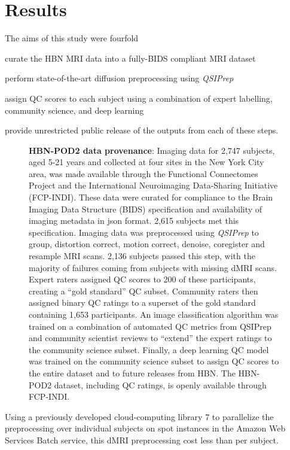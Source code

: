 \documentclass[fleqn,10pt]{wlscirep}
\begin{document}
\section*{Results}

The aims of this study were fourfold
\begin{enumerate*}[%
    label=(\roman*),%
    before=\unskip{: },%
    itemjoin={{, }},%
    itemjoin*={{, and }}]
    \item curate the HBN MRI data into a fully-BIDS compliant MRI dataset
    \item perform state-of-the-art diffusion preprocessing using \emph{QSIPrep}
    \item assign QC scores to each subject using a combination of expert labelling, community science, and deep learning
    \item provide unrestricted public release of the outputs from each of these steps.
\end{enumerate*}

\begin{figure}[ht]
    \centering
    \caption{%
        {\bf HBN-POD2 data provenance}:
        Imaging data for 2,747 subjects, aged 5-21 years and collected at four
        sites in the New York City area, was made available through the
        Functional Connectomes Project and the International Neuroimaging
        Data-Sharing Initiative (FCP-INDI).
        These data were curated for compliance to the Brain Imaging Data
        Structure (BIDS) specification \cite{gorgolewski2016-lh} and
        availability of imaging metadata in json format. 2,615 subjects met this
        specification.
        Imaging data was preprocessed using \emph{QSIPrep} \cite{cieslak2021-iq}
        to group, distortion correct, motion correct, denoise, coregister and
        resample MRI scans. 2,136 subjects passed this step, with the majority
        of failures coming from subjects with missing dMRI scans.
        Expert raters assigned QC scores to 200 of these participants, creating
        a ``gold standard'' QC subset. Community raters then assigned binary QC
        ratings to a superset of the gold standard containing 1,653
        participants. An image classification algorithm was trained on a
        combination of automated QC metrics from QSIPrep and community scientist
        reviews to ``extend'' the expert ratings to the community science
        subset.  Finally, a deep learning QC model was trained on the community
        science subset to assign QC scores to the entire dataset and to future
        releases from HBN.
        The HBN-POD2 dataset, including QC ratings, is openly available through
        FCP-INDI.
    }
    \label{fig:stream}
\end{figure}
Using a previously developed cloud-computing library 7 to parallelize the preprocessing over individual subjects on spot instances in the Amazon Web Services Batch service, this dMRI preprocessing cost less than  per subject.
\end{document}
